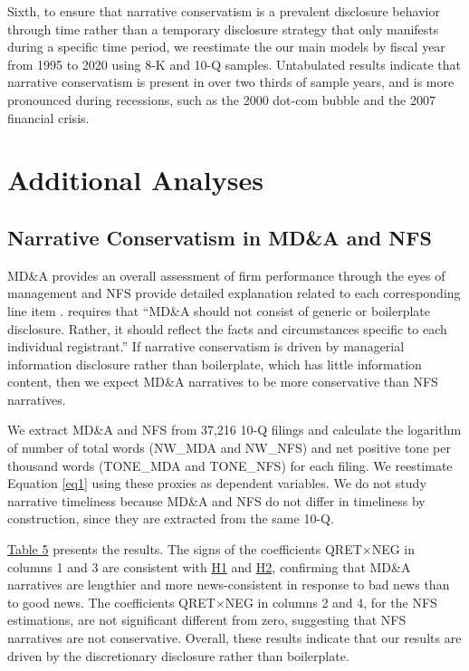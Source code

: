 \documentclass[letterpaper,12pt]{article}
\begin{document}
\begin{spacing}{1.5}
Sixth, to ensure that narrative conservatism is a prevalent disclosure behavior through time rather than a temporary disclosure strategy that only manifests during a specific time period, we reestimate the our main models by fiscal year from 1995 to 2020 using 8-K and 10-Q samples. Untabulated results indicate that narrative conservatism is present in over two thirds of sample years, and is more pronounced during recessions, such as the 2000 dot-com bubble and the 2007 financial crisis.

\section{Additional Analyses}
\subsection{Narrative Conservatism in MD\&A and NFS}
\noindent MD\&A provides an overall assessment of firm performance through the eyes of management and NFS provide detailed explanation related to each corresponding line item \cite{fasbConceptualFrameworkFinancial2018a, secFinancialReportingManual2019}.  requires that ``MD\&A should not consist of generic or boilerplate disclosure. Rather, it should reflect the facts and circumstances specific to each individual registrant.'' If narrative conservatism is driven by managerial information disclosure rather than boilerplate, which has little information content, then we expect MD\&A narratives to be more conservative than NFS narratives.

We extract MD\&A and NFS from 37,216 10-Q filings and calculate the logarithm of number of total words (NW\_MDA and NW\_NFS) and net positive tone per thousand words (TONE\_MDA and TONE\_NFS) for each filing. We reestimate Equation \eqref{eq1} using these proxies as dependent variables. We do not study narrative timeliness because MD\&A and NFS do not differ in timeliness by construction, since they are extracted from the same 10-Q.

\hyperref[T5]{Table 5} presents the results. The signs of the coefficients QRET$\times$NEG in columns 1 and 3 are consistent with \hyperref[h1]{H1} and \hyperref[h2]{H2}, confirming that MD\&A narratives are lengthier and more news-consistent in response to bad news than to good news. The coefficients QRET$\times$NEG in columns 2 and 4, for the NFS estimations, are not significant different from zero, suggesting that NFS narratives are not conservative. Overall, these results indicate that our results are driven by the discretionary disclosure rather than boilerplate.


\end{spacing}
\end{document}

